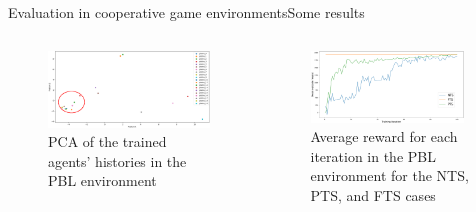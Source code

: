 \begin{frame}{Evaluation in cooperative game environments}{Some results}

    \begin{columns}

        \begin{column}{0.5\textwidth}
            \begin{figure}[h!]
                \centering
                \includegraphics[width=\textwidth]{figures/prahom_pca_analysis.png}
                \caption{PCA of the trained agents' histories in the PBL environment}
                \label{fig:prahom_pca_analysis}
            \end{figure}
        \end{column}

        \hspace{1ex}

        \begin{column}{0.5\textwidth}
            \begin{figure}[h!]
                \centering
                \includegraphics[width=0.95\textwidth]{figures/prahom_learning_curve.png}
                \caption{Average reward for each iteration in the PBL environment for the NTS, PTS, and FTS cases}
                \label{fig:prahom_learning_curve}
            \end{figure}
        \end{column}

    \end{columns}

\end{frame}

